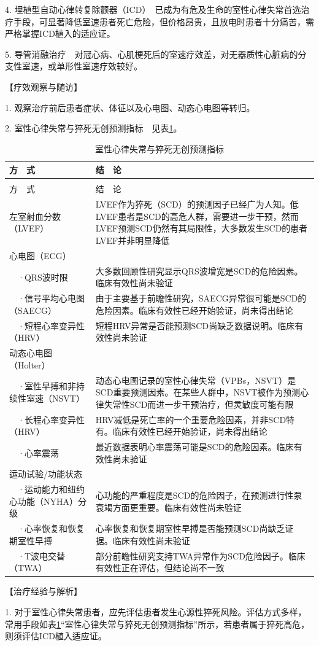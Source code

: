 4.
埋植型自动心律转复除颤器（ICD）　已成为有危及生命的室性心律失常首选治疗手段，可显著降低室速患者死亡危险，但价格昂贵，且放电时患者十分痛苦，需严格掌握ICD植入的适应证。

5.
导管消融治疗　对冠心病、心肌梗死后的室速疗效差，对无器质性心脏病的分支性室速，或单形性室速疗效较好。

【疗效观察与随访】

1. 观察治疗前后患者症状、体征以及心电图、动态心电图等转归。

2. 室性心律失常与猝死无创预测指标　见表\ref{tab2-2-2}。


\begin{longtable}[]{lp{8cm}}
    \caption{室性心律失常与猝死无创预测指标}
    \label{tab2-2-2}\\
\toprule
方　式 & 结　论\tabularnewline
\midrule
\endfirsthead
\caption[]{室性心律失常与猝死无创预测指标}\\
\toprule
方　式 & 结　论\tabularnewline
\midrule
\endhead
\bottomrule
\endfoot
左室射血分数（LVEF） &
LVEF作为猝死（SCD）的预测因子已经广为人知。低LVEF患者是SCD的高危人群，需要进一步干预，然而LVEF预测SCD仍然有其局限性，大多数发生SCD的患者LVEF并非明显降低\tabularnewline
心电图（ECG） &\tabularnewline
　·QRS波时限 &
大多数回顾性研究显示QRS波增宽是SCD的危险因素。临床有效性尚未验证\tabularnewline
　·信号平均心电图（SAECG） &
由于主要基于前瞻性研究，SAECG异常很可能是SCD的危险因素。临床有效性已经开始验证，尚未得出结论\tabularnewline
　·短程心率变异性（HRV） &
短程HRV异常是否能预测SCD尚缺乏数据说明。临床有效性尚未验证\tabularnewline
动态心电图（Holter） &\tabularnewline
　·室性早搏和非持续性室速（NSVT） &
动态心电图记录的室性心律失常（VPBs，NSVT）是SCD重要预测因素。在某些人群中，NSVT被作为预测心律失常性SCD而进一步干预治疗，但灵敏度可能有限\tabularnewline
　·长程心率变异性（HRV） &
HRV减低是死亡率的一个重要危险因素，并非SCD特有。临床有效性已经开始验证，尚未得出结论\tabularnewline
　·心率震荡 &
最近数据表明心率震荡可能是SCD的危险因素。临床有效性尚未验证\tabularnewline
运动试验/功能状态 &\tabularnewline
　·运动能力和纽约心功能（NYHA）分级 &
心功能的严重程度是SCD的危险因子，在预测进行性泵衰竭方面更重要。临床有效性尚未验证\tabularnewline
　·心率恢复和恢复期室性早搏 &
心率恢复和恢复期室性早搏是否能预测SCD尚缺乏证据。临床有效性尚未验证\tabularnewline
　·T波电交替（TWA） &
部分前瞻性研究支持TWA异常作为SCD危险因子。临床有效性正在评估，但结论尚不一致\tabularnewline
\end{longtable}

【治疗经验与解析】

1.
对于室性心律失常患者，应先评估患者发生心源性猝死风险。评估方式多样，常用手段如表\ref{tab2-2-2}“室性心律失常与猝死无创预测指标”所示，若患者属于猝死高危，则须评估ICD植入适应证。

